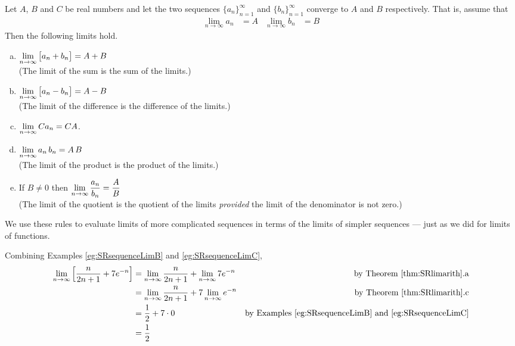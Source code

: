 \begin{theorem}\label{thm:SRlimarith}
  Let $A$, $B$ and $C$ be real numbers and let the two sequences
$\big\{a_n\big\}_{n=1}^\infty$ and  $\big\{b_n\big\}_{n=1}^\infty$
converge to $A$ and $B$ respectively. That is, assume that
 \begin{align*}
  \lim_{n \to \infty} a_n&=A & \lim_{n \to \infty} b_n &=B
\end{align*}
  Then the following limits hold.
\begin{enumerate}[(a)]
 \item $\displaystyle \lim_{n \to \infty} \big[a_n+b_n\big] = A+B$
       \\ (The limit of the sum is the  sum of the limits.)
 \item $\displaystyle \lim_{n \to \infty} \big[a_n-b_n\big] = A-B$
      \\ (The limit of the difference is the difference of the limits.)
\item $\displaystyle \lim_{n \to \infty} C a_n = C A$.
\item $\displaystyle \lim_{n \to \infty} a_n\,b_n = A\,B$
       \\ (The limit of the product is the product of the limits.)
\item If $B \neq 0$ then $\displaystyle \lim_{n \to \infty}\frac{a_n}{b_n} = \frac{A}{B}$
  \\ (The limit of the quotient is the quotient of the limits \emph{provided}
   the limit of the denominator is not zero.)
\end{enumerate}
\end{theorem}

We use these rules to evaluate limits of more complicated sequences
in terms of the limits of simpler sequences --- just as we did for limits of functions.

\begin{eg}\label{eg:SRlimarith}
Combining Examples \ref{eg:SRsequenceLimB} and \ref{eg:SRsequenceLimC},
\begin{align*}
\lim_{n\rightarrow\infty}\Big[\frac{n}{2n+1} + 7 e^{-n}\Big]
&= \lim_{n\rightarrow\infty}\frac{n}{2n+1}
   +\lim_{n\rightarrow\infty} 7 e^{-n}
& \text{by Theorem \ref{thm:SRlimarith}.a}
\\
&= \lim_{n\rightarrow\infty}\frac{n}{2n+1}
   +7\lim_{n\rightarrow\infty} e^{-n}
& \text{by Theorem \ref{thm:SRlimarith}.c}
\\
&=\frac{1}{2} + 7\cdot 0
& \text{by Examples \ref{eg:SRsequenceLimB} and \ref{eg:SRsequenceLimC}}
\\
&=\frac{1}{2}
\end{align*}

\end{eg}

